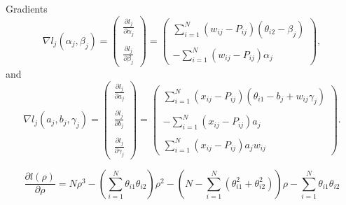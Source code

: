 \documentclass[xcolor=dvipsnames,12pt]{beamer}
\begin{document}
  \begin{frame}{Gradients}
    \begin{equation}
    \label{eq:lik_eq_alpha_beta}
      \nabla l_j(\alpha_j, \beta_j) = 
      \begin{pmatrix}
        \frac{\partial l_j}{\partial \alpha_j}\\
        \\
        \frac{\partial l_j}{\partial \beta_j}
      \end{pmatrix}=
      \begin{pmatrix}
        \sum_{i=1}^{N} (w_{ij}-P_{ij})(\theta_{i2}-\beta_j)\\
        \\
        -\sum_{i=1}^{N} (w_{ij}-P_{ij})\alpha_j
      \end{pmatrix},
    \end{equation}
    and
    \begin{equation}
    \label{eq:lik_eq_a_b_gamma}
      \nabla l_j(a_j,b_j,\gamma_j) =
      \begin{pmatrix}
        \frac{\partial l_j}{\partial a_j}\\
        \\
        \frac{\partial l_j}{\partial b_j}\\
        \\
        \frac{\partial l_j}{\partial \gamma_j}
      \end{pmatrix}=
      \begin{pmatrix}
        \sum_{i=1}^{N} (x_{ij} - P_{ij})(\theta_{i1}-b_j+w_{ij}\gamma_j)\\
        \\
        -\sum_{i=1}^{N} (x_{ij} - P_{ij})a_j\\
        \\
        \sum_{i=1}^{N} (x_{ij} - P_{ij})a_j w_{ij}
      \end{pmatrix}.
    \end{equation}
  \end{frame}

  \begin{frame}
    \begin{equation}
    \label{eq:lik_eq_rho}
      \frac{\partial l(\rho)}{\partial \rho} = N\rho^3-\left(\sum_{i=1}^
      {N}\theta_{i1}\theta_{i2}\right)\rho^2 - \left(N - \sum_{i=1}^{N}
      (\theta_{i1}^2+\theta_{i2}^2)\right)\rho - \sum_{i=1}^{N}\theta_{i1}\theta_{i2}
    \end{equation}
  \end{frame}
\end{document}
